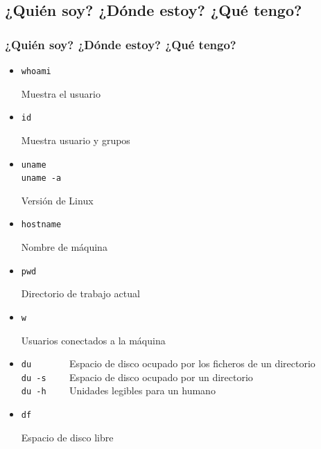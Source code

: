 \documentclass[ucs]{beamer}
\begin{document}
\subsection{¿Quién soy? ¿Dónde estoy? ¿Qué tengo?}
\begin{frame}[fragile]
\frametitle{¿Quién soy? ¿Dónde estoy? ¿Qué tengo?}
\begin{itemize}
\item \texttt{whoami}

Muestra el usuario
\item \texttt{id}

Muestra usuario y grupos
\item \texttt{uname \\
uname -a}

Versión de Linux
\item \texttt{hostname}

Nombre de máquina
\item \texttt{pwd}

Directorio de trabajo actual\\
\item \texttt{w}

Usuarios conectados a la máquina
\end{itemize}



\end{frame}
\begin{frame}[fragile]

\begin{itemize}


\item

\verb|du       |   Espacio de disco ocupado por los ficheros de un directorio\\
\verb|du -s    |   Espacio de disco ocupado por un directorio\\
\verb|du -h    |   Unidades legibles para un humano\\

\item \texttt{df}

Espacio de disco libre
\end{itemize}
\end{frame}
\end{document}
